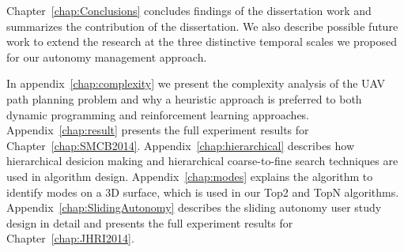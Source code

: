 Chapter~\ref{chap:Conclusions} concludes findings of the dissertation work and summarizes the contribution of the dissertation. 
We also describe possible future work to extend the research at the three distinctive temporal scales we proposed for our autonomy management approach.

In appendix~\ref{chap:complexity} we present the complexity analysis of the UAV path planning problem and why a heuristic approach is preferred to both dynamic programming and reinforcement learning approaches. Appendix~\ref{chap:result} presents the full experiment results for Chapter~\ref{chap:SMCB2014}. Appendix~\ref{chap:hierarchical} describes how hierarchical desicion making and hierarchical coarse-to-fine search techniques are used in algorithm design. Appendix~\ref{chap:modes} explains the algorithm to identify modes on a 3D surface, which is used in our Top2 and TopN algorithms. Appendix~\ref{chap:SlidingAutonomy} describes the sliding autonomy user study design in detail and presents the full experiment results for Chapter~\ref{chap:JHRI2014}.